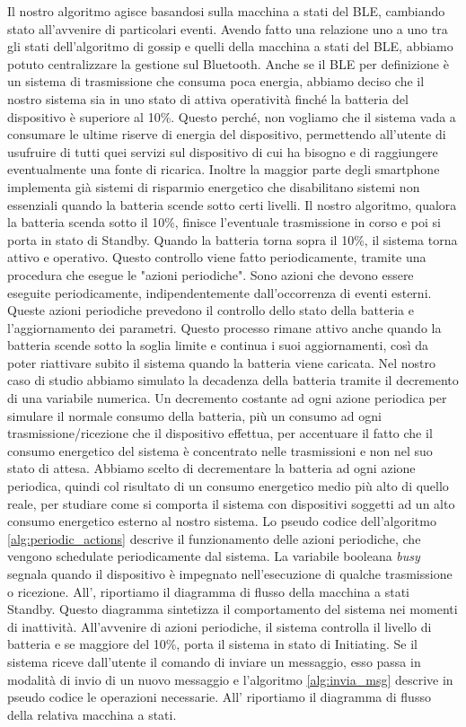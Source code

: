 Il nostro algoritmo agisce basandosi sulla macchina a stati del BLE, cambiando stato all'avvenire di particolari eventi. Avendo fatto una relazione uno a uno tra gli stati dell'algoritmo di gossip e quelli della macchina a stati del BLE, abbiamo potuto centralizzare la gestione sul Bluetooth. Anche se il BLE per definizione è un sistema di trasmissione che consuma poca energia, abbiamo deciso che il nostro sistema sia in uno stato di attiva operatività finché la batteria del dispositivo è superiore al 10\%. Questo perché, non vogliamo che il sistema vada a consumare le ultime riserve di energia del dispositivo, permettendo all'utente di usufruire di tutti quei servizi sul dispositivo di cui ha bisogno e di raggiungere eventualmente una fonte di ricarica. Inoltre la maggior parte degli smartphone implementa già sistemi di risparmio energetico che disabilitano sistemi non essenziali quando la batteria scende sotto certi livelli.
Il nostro algoritmo, qualora la batteria scenda sotto il 10\%, finisce l'eventuale trasmissione in corso e poi si porta in stato di Standby. Quando la batteria torna sopra il 10\%, il sistema torna attivo e operativo. Questo controllo viene fatto periodicamente, tramite una procedura che esegue le "azioni periodiche". Sono azioni che devono essere eseguite periodicamente, indipendentemente dall'occorrenza di eventi esterni. Queste azioni periodiche prevedono il controllo dello stato della batteria e l'aggiornamento dei parametri. Questo processo rimane attivo anche quando la batteria scende sotto la soglia limite e continua i suoi aggiornamenti, così da poter riattivare subito il sistema quando la batteria viene caricata. Nel nostro caso di studio abbiamo simulato la decadenza della batteria tramite il decremento di una variabile numerica. Un decremento costante ad ogni azione periodica per simulare il normale consumo della batteria, più un consumo ad ogni trasmissione/ricezione che il dispositivo effettua, per accentuare il fatto che il consumo energetico del sistema è concentrato nelle trasmissioni e non nel suo stato di attesa. Abbiamo scelto di decrementare la batteria ad ogni azione periodica, quindi col risultato di un consumo energetico medio più alto di quello reale, per studiare come si comporta il sistema con dispositivi soggetti ad un alto consumo energetico esterno al nostro sistema. Lo pseudo codice dell'algoritmo \ref{alg:periodic_actions} descrive il funzionamento delle azioni periodiche, che vengono schedulate periodicamente dal sistema. La variabile booleana \textit{busy} segnala quando il dispositivo è impegnato nell'esecuzione di qualche trasmissione o ricezione. All', riportiamo il diagramma di flusso della macchina a stati Standby. Questo diagramma sintetizza il comportamento del sistema nei momenti di inattività. All'avvenire di azioni periodiche, il sistema controlla il livello di batteria e se maggiore del 10\%, porta il sistema in stato di Initiating. Se il sistema riceve dall'utente il comando di inviare un messaggio, esso passa in modalità di invio di un nuovo messaggio e l'algoritmo \ref{alg:invia_msg} descrive in pseudo codice le operazioni necessarie. All' riportiamo il diagramma di flusso della relativa macchina a stati.
